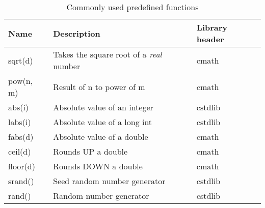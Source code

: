 \begin{table}[h]
\begin{center}
\renewcommand{\arraystretch}{1.8}
\begin{tabular}{ m{3cm} m{8cm} m{3cm}} 
\textbf{Name} & \textbf{Description} & \textbf{Library header}\\
\hline
sqrt(d) & Takes the square root of a \emph{real} number & cmath\\
\hline
pow(n, m) & Result of n to power of m & cmath\\
\hline
abs(i) & Absolute value of an integer & cstdlib\\
\hline
labs(i) & Absolute value of a long int & cstdlib\\
\hline
fabs(d) & Absolute value of a double & cmath\\
\hline
ceil(d) & Rounds UP a double & cmath\\
\hline
floor(d) & Rounds DOWN a double & cmath\\
\hline
srand() & Seed random number generator & cstdlib\\
\hline
rand() & Random number generator & cstdlib\\
\hline
\end{tabular}
\end{center}
\caption{Commonly used predefined functions}
\label{table_1}
\end{table}















